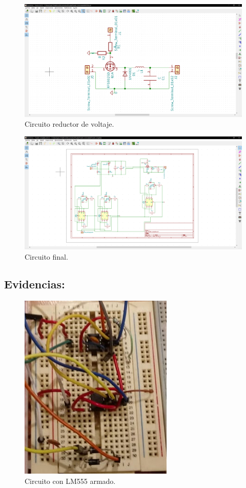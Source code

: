 \documentclass[letterpaper]{article}
\begin{document}
\newpage

\begin{figure}[htbp]
    \centering
    \includegraphics[scale=0.2]{IMG/buk.png}
    \caption{Circuito reductor de voltaje.}
    \label{fig:BUKY}
\end{figure}

\begin{figure}[htbp]
    \centering
    \includegraphics[scale=0.2]{IMG/fuentecompleta.png}
    \caption{Circuito final.}
    \label{fig:FuenteBB}
\end{figure}

\newpage

\subsection{Evidencias:}
\begin{figure}[htbp]
    \centering
    \includegraphics[scale=1]{IMG/555supergenial.PNG}
    \caption{Circuito con LM555 armado.}
    \label{fig:555}
\end{figure}
\end{document}
